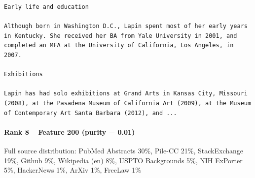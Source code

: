 \begin{verbatim}
Early life and education 

Although born in Washington D.C., Lapin spent most of her early years in Kentucky. She received her BA from Yale University in 2001, and completed an MFA at the University of California, Los Angeles, in 2007.

Exhibitions 

Lapin has had solo exhibitions at Grand Arts in Kansas City, Missouri (2008), at the Pasadena Museum of California Art (2009), at the Museum of Contemporary Art Santa Barbara (2012), and ...

\end{verbatim}

\paragraph*{Rank 8 -- Feature 200 (purity = 0.01)}

Full source distribution: PubMed Abstracts 30\%, Pile-CC 21\%, StackExchange 19\%, Github 9\%, Wikipedia (en) 8\%, USPTO Backgrounds 5\%, NIH ExPorter 5\%, HackerNews 1\%, ArXiv 1\%, FreeLaw 1\%

